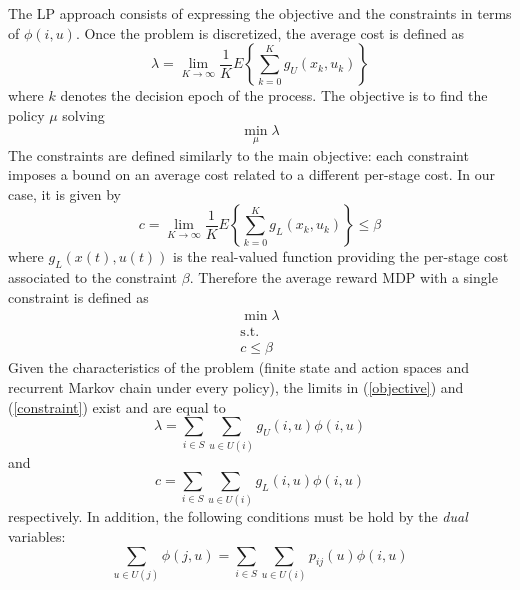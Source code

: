 The LP approach consists of expressing the objective and the constraints in terms of $\phi\left(i,u\right)$. Once the problem is discretized, the average cost is defined as
\begin{equation}\label{objective}
\lambda = \lim_{K\rightarrow\infty}\frac{1}{K}
E\left\{\sum^{K}_{k=0}g_{U}\left(x_{k},u_{k}\right)\right\}
\end{equation}
where $k$ denotes the decision epoch of the process. The objective is to find the policy $\mu$ solving
\begin{equation}
\min_{\mu} \lambda
\end{equation}
The constraints are defined similarly to the main objective: each constraint imposes a bound on an average cost related to a different per-stage cost. In our case, it is given by
\begin{equation}\label{constraint}
c = \lim_{K\rightarrow\infty}\frac{1}{K}
E\left\{\sum^{K}_{k=0}g_{L}\left(x_{k},u_{k}\right)\right\} \leq \beta
\end{equation}
where $g_{L}\left(x(t),u(t)\right)$ is the real-valued function providing the per-stage cost associated to the constraint $\beta$. Therefore the average reward MDP with a single constraint is defined as
\begin{equation}
\begin{array}{c}
\min \lambda\\
\text{s.t.}\\
c \leq \beta
\end{array}
\end{equation}
Given the characteristics of the problem (finite state and action spaces and recurrent Markov chain under every policy), the limits in (\ref{objective}) and (\ref{constraint}) exist and are equal to
\begin{equation}
\lambda = \displaystyle\sum_{i\in S}\displaystyle\sum_{u\in U(i)}g_{U}\left(i,u\right)\phi\left(i,u\right)
\end{equation}
and
\begin{equation}
c = \displaystyle\sum_{i\in S}\displaystyle\sum_{u\in U(i)}g_{L}\left(i,u\right)\phi\left(i,u\right)
\end{equation}
respectively. In addition, the following conditions must be hold by the \textit{dual} variables:
\begin{equation}
\displaystyle\sum_{u\in U(j)}\phi\left(j,u\right) = \displaystyle\sum_{i\in S}\displaystyle\sum_{u\in U(i)}p_{ij}\left(u\right)\phi\left(i,u\right)
\end{equation}
